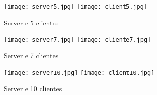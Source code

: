 \documentclass{article}
\begin{document}
\begin{figure}[h]
    \centering
    \texttt{[image: server5.jpg]} 
    \texttt{[image: client5.jpg]} 
    \caption{Server e 5 clientes}
    \label{fig:example}%
\end{figure}

\begin{figure}[h]
    \centering
    \texttt{[image: server7.jpg]} 
    \texttt{[image: cliente7.jpg]} 
    \caption{Server e 7 clientes}
    \label{fig:example}%
\end{figure}

\begin{figure}[h]
    \centering
    \texttt{[image: server10.jpg]} 
    \texttt{[image: client10.jpg]} 
    \caption{Server e 10 clientes}
    \label{fig:example}%
\end{figure}
\end{document}
